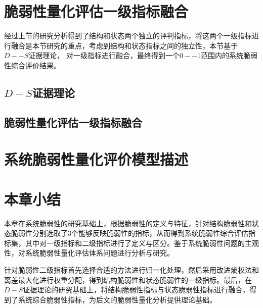 \section{脆弱性量化评估一级指标融合}
经过上节的研究分析得到了结构和状态两个独立的评判指标，将这两个一级指标进行融合是本节研究的重点，考虑到结构和状态指标之间的独立性，本节基于$D--S$证据理论，
对一级指标进行融合，最终得到一个$0--1$范围内的系统脆弱性综合评价结果。



\subsection{$D-S$证据理论}
\label{sec:DStheory}





\subsection{脆弱性量化评估一级指标融合}
\label{sec:DSdistri}






\section{系统脆弱性量化评价模型描述}
\label{sec:systemQuan}





\section{本章小结}
\label{sec:sum4}
本章在系统脆弱性的研究基础上，根据脆弱性的定义与特征，针对结构脆弱性和状态脆弱性分别选取了3个能够反映脆弱性的指标，从而得到系统脆弱性综合评估指标集，其中对一级指标和二级指标进行了定义与区分。鉴于系统脆弱性问题的主观性，对系统脆弱性量化评估体系问题进行分析与研究。

针对脆弱性二级指标首先选择合适的方法进行归一化处理，然后采用改进熵权法和离差最大化进行权重分配，得到结构脆弱性和状态脆弱性的一级指标。最后，在$D-S$证据理论的研究基础上，将结构脆弱性指标与状态脆弱性指标进行融合，得到了系统综合脆弱性指标，为后文的脆弱性量化分析提供理论基础。



